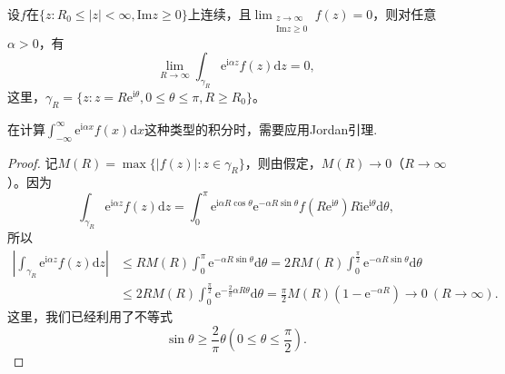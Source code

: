 \documentclass[../../main.tex]{subfiles}
\begin{document}
\begin{lemma}[Jordan引理]\label{lemma:Jordan引理}
设$f$在$\{ z: R_0 \leqslant |z| < \infty, \mathrm{Im} z \geqslant 0 \}$上连续，且$\lim_{\substack{z \to \infty \\ \mathrm{Im} z \geqslant 0}} f(z) = 0$，则对任意$\alpha > 0$，有
\[
\lim_{R \to \infty} \int_{\gamma_R} \mathrm{e}^{\mathrm{i}\alpha z} f(z) \mathrm{d}z = 0,
\]
这里，$\gamma_R = \{ z: z = R\mathrm{e}^{\mathrm{i}\theta}, 0 \leqslant \theta \leqslant \pi, R \geqslant R_0 \}$。
\end{lemma}
\begin{remark}
在计算$\int_{-\infty}^{\infty} \mathrm{e}^{\mathrm{i}\alpha x} f(x) \mathrm{d}x$这种类型的积分时，需要应用Jordan引理.
\end{remark}
\begin{proof}
记$M(R) = \max\{ |f(z)| : z \in \gamma_R \}$，则由假定，$M(R) \to 0$（$R \to \infty$）。因为
\[
\int_{\gamma_R} \mathrm{e}^{\mathrm{i}\alpha z} f(z) \mathrm{d}z = \int_{0}^{\pi} \mathrm{e}^{\mathrm{i}\alpha R\cos\theta} \mathrm{e}^{-\alpha R\sin\theta} f(R\mathrm{e}^{\mathrm{i}\theta}) R\mathrm{i}\mathrm{e}^{\mathrm{i}\theta} \mathrm{d}\theta,
\]
所以
\begin{align*}
\left| \int_{\gamma_R} \mathrm{e}^{\mathrm{i}\alpha z} f(z) \mathrm{d}z \right| &\leqslant R M(R) \int_{0}^{\pi} \mathrm{e}^{-\alpha R\sin\theta} \mathrm{d}\theta
= 2 R M(R) \int_{0}^{\frac{\pi}{2}} \mathrm{e}^{-\alpha R\sin\theta} \mathrm{d}\theta
\\
&\leqslant 2 R M(R) \int_{0}^{\frac{\pi}{2}} \mathrm{e}^{-\frac{2}{\pi}\alpha R\theta} \mathrm{d}\theta
= \frac{\pi}{2} M(R) (1 - \mathrm{e}^{-\alpha R})
\to 0 \ (R \to \infty).
\end{align*}
这里，我们已经利用了不等式
\[
\sin\theta \geqslant \frac{2}{\pi}\theta \left( 0 \leqslant \theta \leqslant \frac{\pi}{2} \right).
\]
\end{proof}
\end{document}
